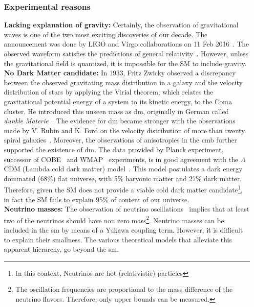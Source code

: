 \subsubsection{Experimental reasons}
\textbf{Lacking explanation of gravity:} Certainly, the observation of gravitational waves is one of the two most exciting discoveries of our decade. The announcement was done by LIGO and Virgo collaborations on 11 Feb 2016~\cite{LigoVirgo}. The observed waveform satisfies the predictions of general relativity~\cite{GR}.
However, unless the gravitational field is quantized, it is impossible for the SM to include gravity.\\
\textbf{No Dark Matter candidate:} In 1933, Fritz Zwicky observed a discrepancy between the observed gravitating mass distribution in a galaxy and the velocity distribution of stars by applying the Virial theorem, which relates the gravitational potential energy of a system to its kinetic energy, to the Coma cluster. He introduced this unseen mass as \acrfull{dm}, originally in German called \textit{dunkle Materie}~\cite{DM1}. The evidence for \acrshort{dm} became stronger with the observations made by V. Rubin and K. Ford on the velocity distribution of more than twenty spiral galaxies~\cite{DM2}. Moreover, the observations of anisotropies in the \acrfull{cmb} further supported the existence of \acrshort{dm}. The data provided by Planck experiment, successor of COBE~\cite{DM4} and WMAP~\cite{DM3} experiments, is in good agreement with the $\Lambda$CDM (Lambda cold dark matter) model~\cite{DM5}. This model postulates a dark energy dominated (68\%) flat universe, with 5\% baryonic matter and 27\% dark matter. Therefore, given the SM does not provide a viable cold dark matter candidate\footnote{In this context, Neutrinos are hot (relativistic) particles}, in fact the SM fails to explain 95\% of content of our universe.\\
\textbf{Neutrino masses:} The observation of neutrino oscillations~\cite{Nu1,Nu2} implies that at least two of the neutrinos should have non zero mass\footnote{The oscillation frequencies are proportional to the mass difference of the neutrino flavors. Therefore, only upper bounds can be measured.}. Neutrino masses can be included in the \acrshort{sm} by means of a Yukawa coupling term. However, it is difficult to explain their smallness. The various theoretical models that alleviate this apparent hierarchy, go beyond the \acrshort{sm}. 

